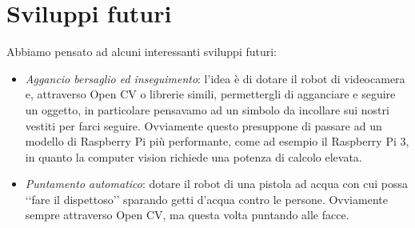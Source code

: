 \documentclass[12pt]{article}
\newcommand{\cbegin}{‘‘}
\newcommand{\cend}{’’}
\newcommand{\raspi}{Raspberry Pi}
\begin{document}
\section{Sviluppi futuri}

Abbiamo pensato ad alcuni interessanti sviluppi futuri:

\begin{itemize}
\item \emph{Aggancio bersaglio ed inseguimento}: l'idea è di dotare il robot di videocamera e, attraverso Open CV o librerie simili, permettergli di agganciare e seguire un oggetto, in particolare pensavamo ad un simbolo da incollare sui nostri vestiti per farci seguire. Ovviamente questo presuppone di passare ad un modello di \raspi{} più performante, come ad esempio il \raspi{} 3, in quanto la computer vision richiede una potenza di calcolo elevata.
\item \emph{Puntamento automatico}: dotare il robot di una pistola ad acqua con cui possa \cbegin fare il dispettoso\cend{} sparando getti d'acqua contro le persone. Ovviamente sempre attraverso Open CV, ma questa volta puntando alle facce.

\end{itemize}
\end{document}
